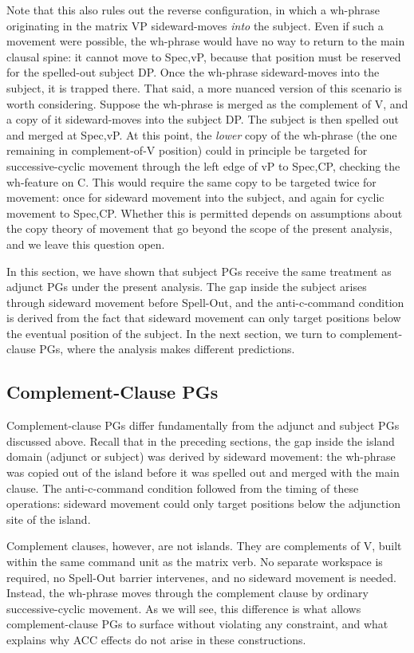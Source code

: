 \documentclass[12pt]{article}
\begin{document}
Note that this also rules out the reverse configuration, in which a wh-phrase originating in the matrix VP sideward-moves \textit{into} the subject. Even if such a movement were possible, the wh-phrase would have no way to return to the main clausal spine: it cannot move to Spec,vP, because that position must be reserved for the spelled-out subject DP. Once the wh-phrase sideward-moves into the subject, it is trapped there. That said, a more nuanced version of this scenario is worth considering. Suppose the wh-phrase is merged as the complement of V, and a copy of it sideward-moves into the subject DP. The subject is then spelled out and merged at Spec,vP. At this point, the \textit{lower} copy of the wh-phrase (the one remaining in complement-of-V position) could in principle be targeted for successive-cyclic movement through the left edge of vP to Spec,CP, checking the wh-feature on C. This would require the same copy to be targeted twice for movement: once for sideward movement into the subject, and again for cyclic movement to Spec,CP. Whether this is permitted depends on assumptions about the copy theory of movement that go beyond the scope of the present analysis, and we leave this question open.

In this section, we have shown that subject PGs receive the same treatment as adjunct PGs under the present analysis. The gap inside the subject arises through sideward movement before Spell-Out, and the anti-c-command condition is derived from the fact that sideward movement can only target positions below the eventual position of the subject. In the next section, we turn to complement-clause PGs, where the analysis makes different predictions.

\subsection{Complement-Clause PGs}

Complement-clause PGs differ fundamentally from the adjunct and subject PGs discussed above. Recall that in the preceding sections, the gap inside the island domain (adjunct or subject) was derived by sideward movement: the wh-phrase was copied out of the island before it was spelled out and merged with the main clause. The anti-c-command condition followed from the timing of these operations: sideward movement could only target positions below the adjunction site of the island.

Complement clauses, however, are not islands. They are complements of V, built within the same command unit as the matrix verb. No separate workspace is required, no Spell-Out barrier intervenes, and no sideward movement is needed. Instead, the wh-phrase moves through the complement clause by ordinary successive-cyclic movement. As we will see, this difference is what allows complement-clause PGs to surface without violating any constraint, and what explains why ACC effects do not arise in these constructions.
\end{document}
